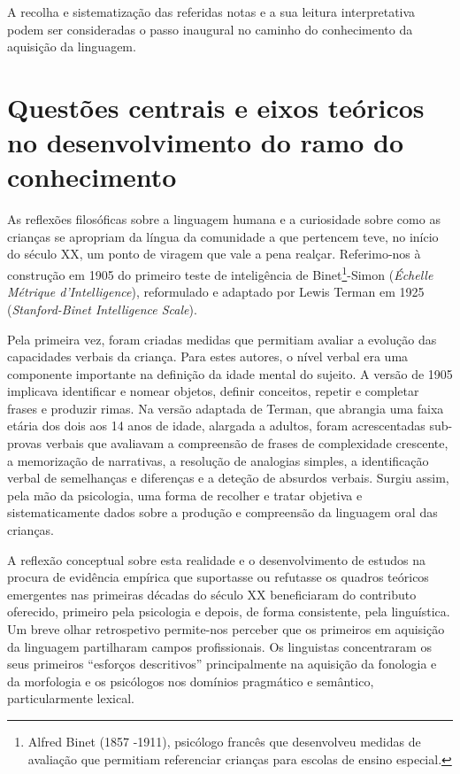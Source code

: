 \documentclass[output=paper]{LSP/langsci}
\begin{document}
A recolha e sistematização das referidas notas e a sua leitura interpretativa podem ser consideradas o passo inaugural no caminho do conhecimento da aquisição da linguagem.

\section{Questões centrais e eixos teóricos no desenvolvimento do ramo do conhecimento}
\label{sec:simsim_questoes_centrais}

As reflexões filosóficas sobre a linguagem humana e a curiosidade sobre como as crianças se apropriam da língua da comunidade a que pertencem teve, no início do século XX, um ponto de viragem que vale a pena realçar. Referimo-nos à construção em 1905 do primeiro teste de inteligência de Binet\footnote{Alfred Binet (1857 -1911), psicólogo francês que desenvolveu medidas de avaliação que permitiam referenciar crianças para escolas de ensino especial.}-Simon (\emph{Échelle Métrique d'Intelligence}), reformulado e adaptado por Lewis Terman em 1925 (\emph{Stanford-Binet Intelligence Scale}).

Pela primeira vez, foram criadas medidas que permitiam avaliar a evolução das capacidades verbais da criança. Para estes autores, o nível verbal era uma componente importante na definição da idade mental do sujeito. A versão de 1905 implicava identificar e nomear objetos, definir conceitos, repetir e completar frases e produzir rimas. Na versão adaptada de Terman, que abrangia uma faixa etária dos dois aos 14 anos de idade, alargada a adultos, foram acrescentadas sub-provas verbais que avaliavam a compreensão de frases de complexidade crescente, a memorização de narrativas, a resolução de analogias simples, a identificação verbal de semelhanças e diferenças e a deteção de absurdos verbais. Surgiu assim, pela mão da psicologia, uma forma de recolher e tratar objetiva e sistematicamente dados sobre a produção e compreensão da linguagem oral das crianças.

A reflexão conceptual sobre esta realidade e o desenvolvimento de estudos na procura de evidência empírica que suportasse ou refutasse os quadros teóricos emergentes nas primeiras décadas do século XX beneficiaram do contributo oferecido, primeiro pela psicologia e depois, de forma consistente, pela linguística. Um breve olhar retrospetivo permite-nos perceber que os primeiros  em aquisição da linguagem partilharam campos profissionais. Os linguistas concentraram os seus primeiros ``esforços descritivos'' principalmente na aquisição da fonologia e da morfologia e os psicólogos nos domínios pragmático e semântico, particularmente lexical.
\end{document}
